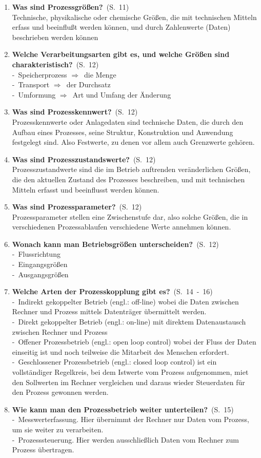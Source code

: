 \documentclass[a4paper,12pt]{article}
\newcommand{\question}[3]{\pagebreak[3]\item {\textbf{#1?}}\ (S.\ #2)#3}
\newcommand{\catchword}[1]{\\-\ #1}
\newcommand{\normaltext}[1]{\\#1}
\newcommand{\resultol}[1]{ $\Rightarrow$\ #1}
\newcommand{\page}[1]{#1}
\newcommand{\pages}[2]{#1\ -\ #2}
\begin{document}
\begin{enumerate}
    \question{Was sind Prozessgrößen}{\page{11}}
  {
    \normaltext{Technische, physikalische oder chemische Größen, die mit technischen Mitteln
    erfass und beeinflußt werden können, und durch Zahlenwerte (Daten) beschrieben werden können}
  }

    \question{Welche Verarbeitungsarten gibt es, und welche Größen sind charakteristisch}{\page{12}}
  {
    \catchword{Speicherprozess \resultol{die Menge}}
    \catchword{Transport \resultol{der Durchsatz}}
    \catchword{Umformung \resultol{Art und Umfang der Änderung}}
  }
  \question{Was sind Prozesskennwert}{\page{12}}
  {
    \normaltext{Prozesskennwerte oder Anlagedaten sind technische Daten, die durch den Aufbau eines
    Prozesses, seine Struktur, Konstruktion und Anwendung festgelegt sind. Also Festwerte, zu denen
    vor allem auch Grenzwerte gehören.}
  }

  \question{Was sind Prozesszustandswerte}{\page{12}}
  {
    \normaltext{Prozesszustandwerte sind die im Betrieb auftrenden veränderlichen Größen, die den 
    aktuellen Zustand des Prozesses beschreiben, und mit technischen Mitteln erfasst und beeinflusst
    werden können.}
  }

  \question{Was sind Prozessparameter}{\page{12}}
  {
    \normaltext{Prozessparameter stellen eine Zwischenstufe dar, also solche Größen, die in verschiedenen
    Prozessablaufen verschiedene Werte annehmen können.}
  }

  \question{Wonach kann man Betriebsgrößen unterscheiden}{\page{12}}
  {
    \catchword{Flussrichtung}
    \catchword{Eingangsgrößen}
    \catchword{Ausgangsgrößen}
  }

  \question{Welche Arten der Prozesskopplung gibt es}{\pages{14}{16}}
  {
    \catchword{Indirekt gekoppelter Betrieb (engl.: off-line) wobei die Daten zwischen Rechner und Prozess
    mittels Datenträger übermittelt werden.}
    \catchword{Direkt gekoppelter Betrieb (engl.: on-line) mit direktem Datenaustausch zwischen Rechner und Prozess}
    \catchword{Offener Prozessbetrieb (engl.: open loop control) wobei der Fluss der Daten einseitig ist und noch 
    teilweise die Mitarbeit des Menschen erfordert.}
    \catchword{Geschlossener Prozessbetrieb (engl.: closed loop control) ist ein vollständiger Regelkreis, bei dem 
    Istwerte vom Prozess aufgenommen, miet den Sollwerten im Rechner vergleichen und daraus wieder Steuerdaten für
    den Prozess gewonnen werden.}
  }

  \question{Wie kann man den Prozessbetrieb weiter unterteilen}{\page{15}}
  {
    \catchword{Messwerterfassung. Hier übernimmt der Rechner nur Daten vom Prozess, um sie weiter zu verarbeiten.}
    \catchword{Prozesssteuerung. Hier werden ausschließlich Daten vom Rechner zum Prozess übertragen. }
  }


\end{enumerate}
\end{document}

